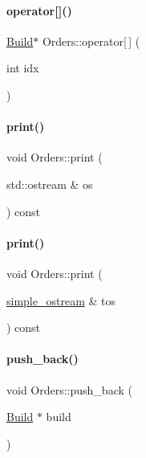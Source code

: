 \paragraph{\texorpdfstring{operator[]()}{operator[]()}\hspace{0.1cm}{\footnotesize\ttfamily [2/2]}}
{\footnotesize\ttfamily \mbox{\hyperlink{class_build}{Build}}$\ast$ Orders\+::operator\mbox{[}$\,$\mbox{]} (\begin{DoxyParamCaption}\item[{int}]{idx }\end{DoxyParamCaption})\hspace{0.3cm}{\ttfamily [inline]}}

\mbox{\label{class_orders_a57fb3a5db65235ac3eb6dee473f7ef34}} 
\paragraph{\texorpdfstring{print()}{print()}\hspace{0.1cm}{\footnotesize\ttfamily [1/2]}}
{\footnotesize\ttfamily void Orders\+::print (\begin{DoxyParamCaption}\item[{std\+::ostream \&}]{os }\end{DoxyParamCaption}) const}

\mbox{\label{class_orders_a081beda059e45de92599fa48a8668c54}} 
\paragraph{\texorpdfstring{print()}{print()}\hspace{0.1cm}{\footnotesize\ttfamily [2/2]}}
{\footnotesize\ttfamily void Orders\+::print (\begin{DoxyParamCaption}\item[{\mbox{\hyperlink{structsimple__ostream}{simple\+\_\+ostream}} \&}]{tos }\end{DoxyParamCaption}) const}

\mbox{\label{class_orders_a6d8d6db032983700fa68cca43dc75a38}} 
\paragraph{\texorpdfstring{push\_back()}{push\_back()}}
{\footnotesize\ttfamily void Orders\+::push\+\_\+back (\begin{DoxyParamCaption}\item[{\mbox{\hyperlink{class_build}{Build}} $\ast$}]{build }\end{DoxyParamCaption})\hspace{0.3cm}{\ttfamily [inline]}}

